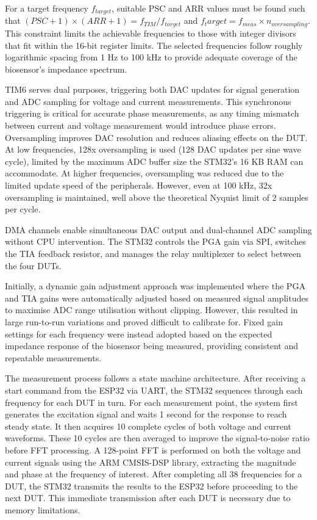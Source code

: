 For a target frequency $f_{target}$, suitable PSC and ARR values must be found such that $(PSC + 1) \times (ARR + 1) = f_{TIM} / f_{target}$ and $f_target = f_{meas} \times n_{oversampling}$. This constraint limits the achievable frequencies to those with integer divisors that fit within the 16-bit register limits. The selected frequencies follow roughly logarithmic spacing from 1 Hz to 100 kHz to provide adequate coverage of the biosensor's impedance spectrum.

TIM6 serves dual purposes, triggering both \ac{DAC} updates for signal generation and \ac{ADC} sampling for voltage and current measurements. This synchronous triggering is critical for accurate phase measurements, as any timing mismatch between current and voltage measurement would introduce phase errors. Oversampling improves \ac{DAC} resolution and reduces aliasing effects on the \ac{DUT}. At low frequencies, 128x oversampling is used (128 \ac{DAC} updates per sine wave cycle), limited by the maximum \ac{ADC} buffer size the STM32's 16 KB RAM can accommodate. At higher frequencies, oversampling was reduced due to the limited update speed of the peripherals. However, even at 100 kHz, 32x oversampling is maintained, well above the theoretical Nyquist limit of 2 samples per cycle.

\ac{DMA} channels enable simultaneous \ac{DAC} output and dual-channel \ac{ADC} sampling without CPU intervention. The STM32 controls the \ac{PGA} gain via SPI, switches the \ac{TIA} feedback resistor, and manages the relay multiplexer to select between the four \acp{DUT}.

Initially, a dynamic gain adjustment approach was implemented where the \ac{PGA} and \ac{TIA} gains were automatically adjusted based on measured signal amplitudes to maximise \ac{ADC} range utilisation without clipping. However, this resulted in large run-to-run variations and proved difficult to calibrate for. Fixed gain settings for each frequency were instead adopted based on the expected impedance response of the biosensor being measured, providing consistent and repeatable measurements.

The measurement process follows a state machine architecture. After receiving a start command from the ESP32 via UART, the STM32 sequences through each frequency for each \ac{DUT} in turn. For each measurement point, the system first generates the excitation signal and waits 1 second for the response to reach steady state. It then acquires 10 complete cycles of both voltage and current waveforms. These 10 cycles are then averaged to improve the signal-to-noise ratio before FFT processing. A 128-point FFT is performed on both the voltage and current signals using the ARM CMSIS-DSP library, extracting the magnitude and phase at the frequency of interest. After completing all 38 frequencies for a \ac{DUT}, the STM32 transmits the results to the ESP32 before proceeding to the next \ac{DUT}. This immediate transmission after each \ac{DUT} is necessary due to memory limitations.

